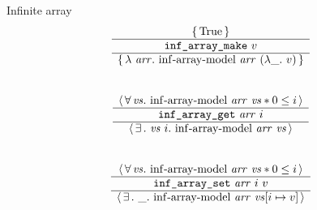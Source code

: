 \begin{frame}{Infinite array}
\[
	\begin{array}{c}
			\triplePretty{
				\iTrue
			}{
				\texttt{inf\_array\_make}\ v
			}{
				\lambda\ \mathit{arr} .\ 
				\mathrm{inf \mathhyphen array \mathhyphen model}\ \mathit{arr}\ (\lambda \_ .\ v)
			}
		\\\\\\
			\atriplePretty{
				\mathit{vs}
			}{
				\mathrm{inf \mathhyphen array \mathhyphen model}\ \mathit{arr}\ \mathit{vs} \iSep
				0 \leq i
			}{
				\texttt{inf\_array\_get}\ \mathit{arr}\ i
			}{
			}{
				\mathit{vs}\ i
			}{
				\mathrm{inf \mathhyphen array \mathhyphen model}\ \mathit{arr}\ \mathit{vs}
			}
		\\\\\\
			\atriplePretty{
				\mathit{vs}
			}{
				\mathrm{inf \mathhyphen array \mathhyphen model}\ \mathit{arr}\ \mathit{vs} \iSep
				0 \leq i
			}{
				\texttt{inf\_array\_set}\ \mathit{arr}\ i\ v
			}{
			}{
				\_
			}{
				\mathrm{inf \mathhyphen array \mathhyphen model}\ \mathit{arr}\ \mathit{vs} [i \mapsto v]
			}
	\end{array}
\]
\end{frame}